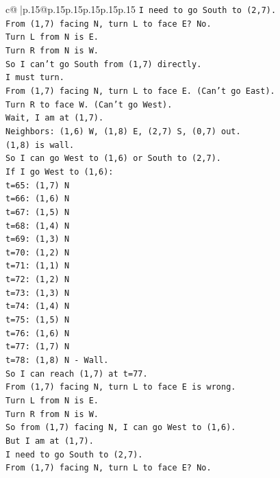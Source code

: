 \documentclass{article}
\begin{document}
{\begin{supertabular}{c@{$\;$}|p{.15\linewidth}@{}p{.15\linewidth}p{.15\linewidth}p{.15\linewidth}p{.15\linewidth}p{.15\linewidth}}
{{{\texttt{I need to go South to (2,7).} \\
\texttt{From (1,7) facing N, turn L to face E? No.} \\
\texttt{Turn L from N is E.} \\
\texttt{Turn R from N is W.} \\
\texttt{So I can't go South from (1,7) directly.} \\
\texttt{I must turn.} \\
\texttt{From (1,7) facing N, turn L to face E. (Can't go East).} \\
\texttt{Turn R to face W. (Can't go West).} \\
\texttt{Wait, I am at (1,7).} \\
\texttt{Neighbors: (1,6) W, (1,8) E, (2,7) S, (0,7) out.} \\
\texttt{(1,8) is wall.} \\
\texttt{So I can go West to (1,6) or South to (2,7).} \\
\texttt{If I go West to (1,6):} \\
\texttt{t=65: (1,7) N} \\
\texttt{t=66: (1,6) N} \\
\texttt{t=67: (1,5) N} \\
\texttt{t=68: (1,4) N} \\
\texttt{t=69: (1,3) N} \\
\texttt{t=70: (1,2) N} \\
\texttt{t=71: (1,1) N} \\
\texttt{t=72: (1,2) N} \\
\texttt{t=73: (1,3) N} \\
\texttt{t=74: (1,4) N} \\
\texttt{t=75: (1,5) N} \\
\texttt{t=76: (1,6) N} \\
\texttt{t=77: (1,7) N} \\
\texttt{t=78: (1,8) N {-} Wall.} \\
\texttt{So I can reach (1,7) at t=77.} \\
\texttt{From (1,7) facing N, turn L to face E is wrong.} \\
\texttt{Turn L from N is E.} \\
\texttt{Turn R from N is W.} \\
\texttt{So from (1,7) facing N, I can go West to (1,6).} \\
\texttt{But I am at (1,7).} \\
\texttt{I need to go South to (2,7).} \\
\texttt{From (1,7) facing N, turn L to face E? No.} \\
}}}
\end{supertabular}}
\end{document}
